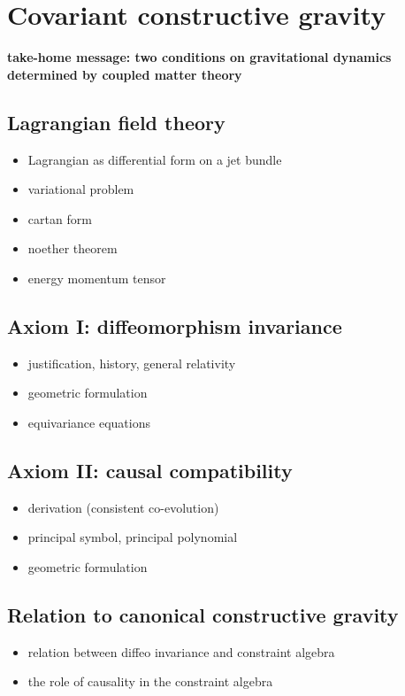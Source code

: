 \chapter{Covariant constructive gravity}

\textbf{take-home message: two conditions on gravitational dynamics determined by coupled matter theory}

\section{Lagrangian field theory}
\begin{itemize}
\item Lagrangian as differential form on a jet bundle
\item variational problem
\item cartan form
\item noether theorem
\item energy momentum tensor
\end{itemize}

\section{Axiom I: diffeomorphism invariance}
\begin{itemize}
\item justification, history, general relativity
\item geometric formulation
\item equivariance equations
\end{itemize}

\section{Axiom II: causal compatibility}
\begin{itemize}
\item derivation (consistent co-evolution)
\item principal symbol, principal polynomial
\item geometric formulation
\end{itemize}

\section{Relation to canonical constructive gravity}
\begin{itemize}
\item relation between diffeo invariance and constraint algebra
\item the role of causality in the constraint algebra
\end{itemize}

